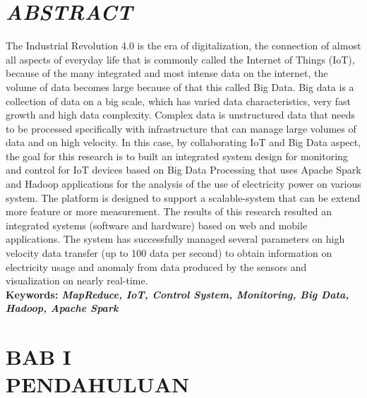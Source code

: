 \documentclass[12pt,a4paper]{report}
\renewcommand{\headrulewidth}{0pt}%
\renewcommand\headrulewidth{0pt}
\renewcommand{\headrulewidth}{0pt}
\begin{document}
\chapter*{\centering \textit{ABSTRACT}}
\thispagestyle{myplain}
\begin{spacing}{1.0}
\noindent The Industrial Revolution 4.0 is the era of digitalization, the connection of almost all aspects of everyday life that is commonly called the Internet of Things (IoT), because of the many integrated and most intense data on the internet, the volume of data becomes large because of that this called Big Data. Big data is a collection of data on a big scale, which has varied data characteristics, very fast growth and high data complexity. Complex data is unstructured data that needs to be processed specifically with infrastructure that can manage large volumes of data and on high velocity. In this case, by collaborating IoT and Big Data aspect, the goal for this research is to built an integrated system design for monitoring and control for IoT devices based on Big Data Processing that uses Apache Spark and Hadoop applications for the analysis of the use of electricity power on various system. The platform is designed to support a scalable-system that can be extend more feature or more measurement. The results of this research resulted an integrated systems (software and hardware) based on web and mobile applications. The system has successfully managed several parameters on high velocity data transfer (up to 100 data per second) to obtain information on electricity usage and anomaly from data produced by the sensors and visualization on nearly real-time.\\
\textbf{Keywords: \textit{MapReduce, IoT, Control System, Monitoring, Big Data, Hadoop, Apache Spark}}
\end{spacing}

\thispagestyle{myplain}
\fancypagestyle{plain}{%
\fancyhf{}
\renewcommand{\headrulewidth}{0pt}
\fancyfoot[C]{\thepage}
}
\newpage
\normalsize {\tableofcontents}
\newpage
\normalsize {\listoffigures}
\newpage
\normalsize {\listoftables}

\renewcommand{\thechapter}{\Roman{chapter}}
\chapter*{BAB I \\ PENDAHULUAN}
\renewcommand{\thesection}{\arabic{section}}
\setcounter{chapter}{+1}
\thispagestyle{myplain}
\setcounter{page}{8}				%
\end{document}
